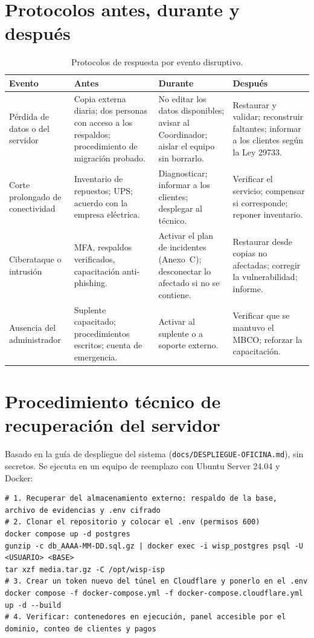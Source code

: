 \section{Protocolos antes, durante y después}

\begin{table}[H]
\centering
\caption{Protocolos de respuesta por evento disruptivo.}
\label{tab:anx-pcn-protocolos}
\small
\begin{tabularx}{\textwidth}{L{2.4cm}XXX}
\toprule
\textbf{Evento} & \textbf{Antes} & \textbf{Durante} & \textbf{Después} \\
\midrule
Pérdida de datos o del servidor & Copia externa diaria; dos personas con acceso a los respaldos; procedimiento de migración probado. & No editar los datos disponibles; avisar al Coordinador; aislar el equipo sin borrarlo. & Restaurar y validar; reconstruir faltantes; informar a los clientes según la Ley 29733. \\
Corte prolongado de conectividad & Inventario de repuestos; UPS; acuerdo con la empresa eléctrica. & Diagnosticar; informar a los clientes; desplegar al técnico. & Verificar el servicio; compensar si corresponde; reponer inventario. \\
Ciberataque o intrusión & MFA, respaldos verificados, capacitación anti-phishing. & Activar el plan de incidentes (Anexo~C); desconectar lo afectado si no se contiene. & Restaurar desde copias no afectadas; corregir la vulnerabilidad; informe. \\
Ausencia del administrador & Suplente capacitado; procedimientos escritos; cuenta de emergencia. & Activar al suplente o a soporte externo. & Verificar que se mantuvo el MBCO; reforzar la capacitación. \\
\bottomrule
\end{tabularx}
\end{table}

\section{Procedimiento técnico de recuperación del servidor}

Basado en la guía de despliegue del sistema (\texttt{docs/DESPLIEGUE-OFICINA.md}), sin
secretos. Se ejecuta en un equipo de reemplazo con Ubuntu Server 24.04 y Docker:

\begin{lstlisting}[style=plano]
# 1. Recuperar del almacenamiento externo: respaldo de la base, archivo de evidencias y .env cifrado
# 2. Clonar el repositorio y colocar el .env (permisos 600)
docker compose up -d postgres
gunzip -c db_AAAA-MM-DD.sql.gz | docker exec -i wisp_postgres psql -U <USUARIO> <BASE>
tar xzf media.tar.gz -C /opt/wisp-isp
# 3. Crear un token nuevo del túnel en Cloudflare y ponerlo en el .env
docker compose -f docker-compose.yml -f docker-compose.cloudflare.yml up -d --build
# 4. Verificar: contenedores en ejecución, panel accesible por el dominio, conteo de clientes y pagos
\end{lstlisting}

